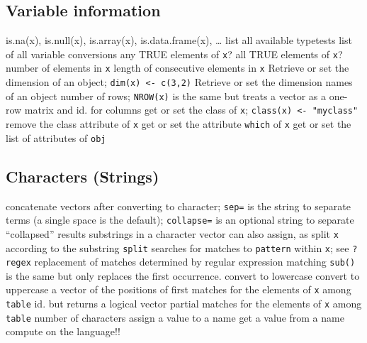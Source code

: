 \subsection{Variable information}{is.na(x), is.null(x), is.array(x), is.data.frame(x), \ldots}
	{list all available typetests}
	{list of all variable conversions}
	{any TRUE elements of {\tt x}?}
	{all TRUE elements of {\tt x}?}
	{ number of elements in {\tt x}}
	{length of consecutive elements in {\tt x}}
	{Retrieve or set the dimension of an object; {\tt dim(x) <- c(3,2)}}
	{Retrieve or set the dimension names of an object}
	{number of rows; {\tt NROW(x)} is the same but treats a vector as a one-row matrix}
	{and}
	{id. for columns}
	{get or set the class of {\tt x}; {\tt class(x) <- "myclass"}}
	{remove the class attribute of {\tt x}}
	{get or set the attribute {\tt which} of {\tt x}}
	{get or set the list of attributes of {\tt obj}}

\subsection{Characters (Strings)}{}
	{concatenate vectors after converting to character; {\tt sep=} is the string to separate terms (a single space is the default); {\tt collapse=} is an optional string to separate ``collapsed'' results}
	{substrings in a character vector}
	{can also assign, as}
	{split {\tt x} according to the substring {\tt split}}
	{searches for matches to {\tt pattern} within {\tt x}; see {\tt ?regex}}
	{replacement of matches determined by regular expression matching {\tt sub()} is the same but only replaces the first occurrence.}
	{convert to lowercase}
	{convert to uppercase}
	{a vector of the positions of first matches for the elements of {\tt x} among {\tt table}}
	{id. but returns a logical vector}
	{partial matches for the elements of {\tt x} among {\tt table}}
	{number of characters}
	{assign a value to a name}
	{get a value from a name}
	{compute on the language!!}

